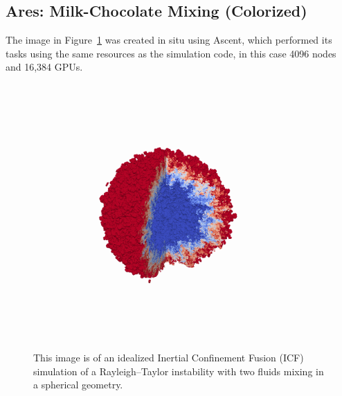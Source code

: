\subsection{Ares: Milk-Chocolate Mixing (Colorized)}

The image in Figure~\ref{img:icf} was created in situ using
Ascent, which performed its tasks using
the same resources as the simulation code, in this
case 4096 nodes and 16,384 GPUs.

\begin{figure}
\centering
\includegraphics[trim={ 0 8cm 0 7cm},width=0.9\textwidth]{images/mixing_ball}
\caption{\label{img:icf}
This image is of an idealized Inertial Confinement
Fusion (ICF) simulation of a Rayleigh–Taylor instability
with two fluids mixing in a spherical geometry.
}
\end{figure}
